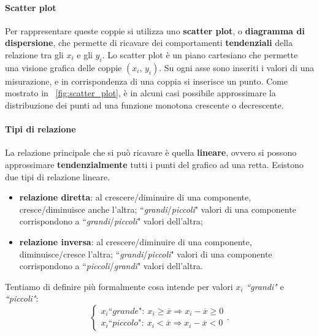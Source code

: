 \paragraph{Scatter plot} 

Per rappresentare queste coppie si utilizza uno \textbf{scatter plot}, o \textbf{diagramma di dispersione}, che permette di ricavare dei comportamenti \textbf{tendenziali} della relazione tra gli $x_i$ e gli $y_i$. Lo scatter plot è un piano cartesiano che permette una visione grafica delle coppie $(x_i, \, y_i)$. Su ogni asse sono inseriti i valori di una misurazione, e in corrispondenza di una coppia si inserisce un punto.
Come mostrato in \figurename \ \ref{fig:scatter_plot}, è in alcuni casi possibile approssimare la distribuzione dei punti ad una funzione monotona crescente o decrescente.

\paragraph{Tipi di relazione}
La relazione principale che si può ricavare è quella \textbf{lineare}, ovvero si possono approssimare \textbf{tendenzialmente} tutti i punti del grafico ad una retta. Esistono due tipi di relazione lineare.

\begin{itemize}
    \item \textbf{relazione diretta}: al crescere/diminuire di una componente, cresce/diminuisce anche l'altra; \linebreak ``\textit{grandi}/\textit{piccoli}" valori di una componente corrispondono a ``\textit{grandi}/\textit{piccoli}" valori dell'altra;
    \item \textbf{relazione inversa}: al crescere/diminuire di una componente, diminuisce/cresce l'altra; \linebreak ``\textit{grandi}/\textit{piccoli}" valori di una componente corrispondono a ``\textit{piccoli}/\textit{grandi}" valori dell'altra.
\end{itemize}

\noindent Tentiamo di definire più formalmente cosa intende per valori $x_i$ \textit{``grandi"} e \textit{``piccoli"}:
\[
\begin{cases}
x_i \textit{``grande"}: \: x_i \geq \overline x \Rightarrow x_i - \overline x \geq 0 \\
x_i \textit{``piccolo"}: \: x_i < \overline x \Rightarrow x_i - \overline x < 0
\end{cases} \! \! \! \! \! \! .
\]

